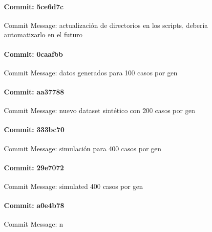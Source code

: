\documentclass{article}
\begin{document}
\paragraph{Commit: 5ce6d7c}
Commit Message: actualización de directorios en los scripts, debería automatizarlo en el futuro

\paragraph{Commit: 0caafbb}
Commit Message: datos generados para 100 casos por gen

\paragraph{Commit: aa37788}
Commit Message: nuevo dataset sintético con 200 casos por gen

\paragraph{Commit: 333bc70}
Commit Message: simulación para 400 casos por gen

\paragraph{Commit: 29e7072}
Commit Message: simulated 400 casos por gen

\paragraph{Commit: a0e4b78}
Commit Message: n

\end{document}
